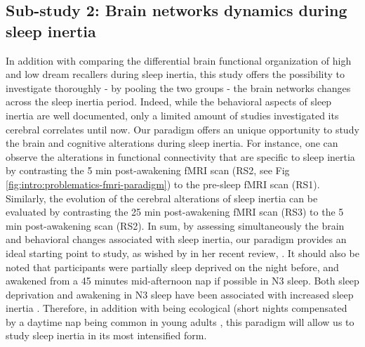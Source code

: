\subsection{Sub-study 2: Brain networks dynamics during sleep inertia}
\label{sec:problematic:inertia:overview}

In addition with comparing the differential brain functional organization of high and low dream recallers during sleep inertia, this study offers the possibility to investigate thoroughly - by pooling the two groups - the brain networks changes across the sleep inertia period. Indeed, while the behavioral aspects of sleep inertia are well documented, only a limited amount of studies investigated its cerebral correlates until now. Our paradigm offers an unique opportunity to study the brain and cognitive alterations during sleep inertia. For instance, one can observe the alterations in functional connectivity that are specific to sleep inertia by contrasting the 5 min post-awakening fMRI scan (RS2, see Fig \ref{fig:intro:problematics-fmri-paradigm}) to the pre-sleep fMRI scan (RS1). Similarly, the evolution of the cerebral alterations of sleep inertia can be evaluated by contrasting the 25 min post-awakening fMRI scan (RS3) to the 5 min post-awakening scan (RS2). In sum, by assessing simultaneously the brain and behavioral changes associated with sleep inertia, our paradigm provides an ideal starting point to study, as wished by \citet{trotti_waking_2016} in her recent review, . It should also be noted that participants were partially sleep deprived on the night before, and awakened from a 45 minutes mid-afternoon nap if possible in N3 sleep. Both sleep deprivation and awakening in N3 sleep have been associated with increased sleep inertia \citep{tassi_sleep_2000}. Therefore, in addition with being ecological (short nights compensated by a daytime nap being common in young adults \citep{faraut_napping:_2016}, this paradigm will allow us to study sleep inertia in its most intensified form.


